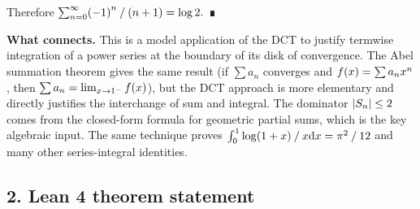 \documentclass[
]{article}
\begin{document}
Therefore
\(\sum_{n={\mNumber{0}}}^{\infty} \mathopen{\mDelimiter{(}}-{\mNumber{1}}\mathclose{\mDelimiter{)}}^{n}\mathbin{\mBridgeOperator{/}}\mathopen{\mDelimiter{(}}n+{\mNumber{1}}\mathclose{\mDelimiter{)}} = \log {\mNumber{2}}.\)
∎

\textbf{What connects.} This is a model application of the DCT to
justify termwise integration of a power series at the boundary of its
disk of convergence. The Abel summation theorem gives the same result
(if \(\sum a_{n}\) converges and
\(f\mathopen{\mDelimiter{(}}x\mathclose{\mDelimiter{)}} = \sum a_{n}x^{n}\),
then
\(\sum a_{n} = \lim_{x\to {\mNumber{1}}^{-}} f\mathopen{\mDelimiter{(}}x\mathclose{\mDelimiter{)}}\)),
but the DCT approach is more elementary and directly justifies the
interchange of sum and integral. The dominator
\(\mathopen{\mDelimiter{|}}S_{n}\mathclose{\mDelimiter{|}} \le {\mNumber{2}}\)
comes from the closed-form formula for geometric partial sums, which is
the key algebraic input. The same technique proves
\(\int_{{\mNumber{0}}}^{{\mNumber{1}}} \log\mathopen{\mDelimiter{(}}{\mNumber{1}}+x\mathclose{\mDelimiter{)}}\mathbin{\mBridgeOperator{/}}x \mathrm{d}x = \pi^{{\mNumber{2}}}\mathbin{\mBridgeOperator{/}}{\mNumber{12}}\)
and many other series-integral identities.

\hypertarget{lean-4-theorem-statement}{%
\subsection{2. Lean 4 theorem
statement}\label{lean-4-theorem-statement}}
\end{document}
